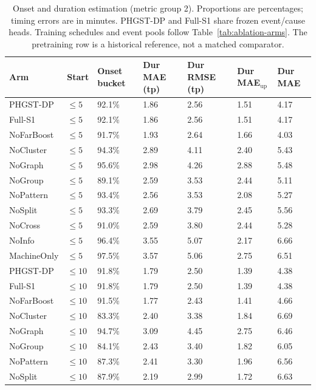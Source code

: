 \begin{table}[p]
\centering
\scriptsize
\setlength{\tabcolsep}{3pt}
\renewcommand{\arraystretch}{1.12}
\caption{Onset and duration estimation (metric group 2). Proportions are percentages; timing errors are in minutes. PHGST-DP and Full-S1 share frozen event/cause heads. Training schedules and event pools follow Table~\ref{tab:ablation-arms}. The pretraining row is a historical reference, not a matched comparator.}
\label{tab:complete-2-2}
\begin{tabularx}{\textwidth}{@{}lXXXXXX@{}}
\toprule
Arm & Start & Onset bucket & Dur MAE (tp) & Dur RMSE (tp) & Dur MAE$_{\mathrm{up}}$ & \textbf{Dur MAE} \\
\midrule
PHGST-DP & $\le 5$ & 92.1\% & 1.86 & 2.56 & 1.51 & 4.17 \\
Full-S1 & $\le 5$ & 92.1\% & 1.86 & 2.56 & 1.51 & 4.17 \\
NoFarBoost & $\le 5$ & 91.7\% & 1.93 & 2.64 & 1.66 & 4.03 \\
NoCluster & $\le 5$ & 94.3\% & 2.89 & 4.11 & 2.40 & 5.43 \\
NoGraph & $\le 5$ & 95.6\% & 2.98 & 4.26 & 2.88 & 5.48 \\
NoGroup & $\le 5$ & 89.1\% & 2.59 & 3.53 & 2.44 & 5.11 \\
NoPattern & $\le 5$ & 93.4\% & 2.56 & 3.53 & 2.08 & 5.27 \\
NoSplit & $\le 5$ & 93.3\% & 2.69 & 3.79 & 2.45 & 5.56 \\
NoCross & $\le 5$ & 91.0\% & 2.59 & 3.80 & 2.44 & 5.28 \\
NoInfo & $\le 5$ & 96.4\% & 3.55 & 5.07 & 2.17 & 6.66 \\
MachineOnly & $\le 5$ & 97.5\% & 3.57 & 5.06 & 2.75 & 6.51 \\
\midrule
PHGST-DP & $\le 10$ & 91.8\% & 1.79 & 2.50 & 1.39 & 4.38 \\
Full-S1 & $\le 10$ & 91.8\% & 1.79 & 2.50 & 1.39 & 4.38 \\
NoFarBoost & $\le 10$ & 91.5\% & 1.77 & 2.43 & 1.41 & 4.66 \\
NoCluster & $\le 10$ & 83.3\% & 2.40 & 3.38 & 1.84 & 6.69 \\
NoGraph & $\le 10$ & 94.7\% & 3.09 & 4.45 & 2.75 & 6.46 \\
NoGroup & $\le 10$ & 84.1\% & 2.43 & 3.40 & 1.82 & 6.05 \\
NoPattern & $\le 10$ & 87.3\% & 2.41 & 3.30 & 1.96 & 6.56 \\
NoSplit & $\le 10$ & 87.9\% & 2.19 & 2.99 & 1.72 & 6.63 \\

\end{tabularx}
\end{table}
